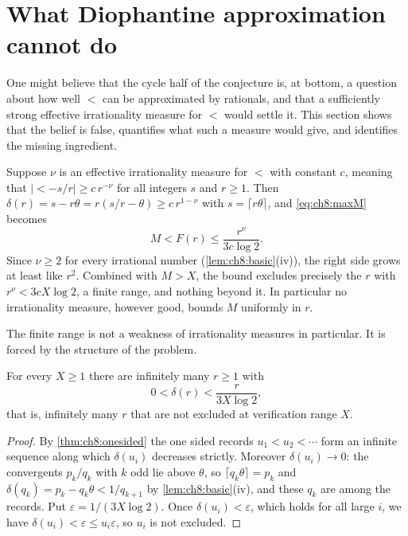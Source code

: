\section{What Diophantine approximation cannot do}\label{sec:ch8:limits}

One might believe that the cycle half of the conjecture is, at bottom,
a question about how well $\lt$ can be approximated by rationals, and that a
sufficiently strong effective irrationality measure for $\lt$ would settle it.
This section shows that the belief is false, quantifies what such a measure
would give, and identifies the missing ingredient.

\begin{remark}\label{rem:irrmeasure}
Suppose $\nu$ is an effective irrationality measure for $\lt$ with constant
$c$, meaning that $|\lt-s/r|\geq c\,r^{-\nu}$ for all integers $s$ and
$r\geq1$. Then $\delta(r)=s-r\theta=r(s/r-\theta)\geq c\,r^{1-\nu}$ with
$s=\lceil r\theta\rceil$, and \eqref{eq:ch8:maxM} becomes
\begin{equation}\label{eq:ch8:irrbound}
  M<F(r)\leq\frac{r^{\nu}}{3c\log2}.
\end{equation}
Since $\nu\geq2$ for every irrational number (\cref{lem:ch8:basic}(iv)), the
right side grows at least like $r^2$. Combined with $M>X$, the bound excludes
precisely the $r$ with $r^{\nu}<3cX\log2$, a finite range, and nothing beyond
it. In particular no irrationality measure, however good, bounds $M$ uniformly in $r$.
\end{remark}

The finite range is not a weakness of irrationality measures in particular.
It is forced by the structure of the problem.

\begin{proposition}\label{prop:ch8:insufficient}
For every $X\geq1$ there are infinitely many $r\geq1$ with
\[
  0<\delta(r)<\frac{r}{3X\log2},
\]
that is, infinitely many $r$ that are not excluded at verification range $X$.
\end{proposition}

\begin{proof}
By \cref{thm:ch8:onesided} the one sided records $u_1<u_2<\cdots$ form an
infinite sequence along which $\delta(u_i)$ decreases strictly. Moreover
$\delta(u_i)\to0$: the convergents $p_k/q_k$ with $k$ odd lie above $\theta$,
so $\lceil q_k\theta\rceil=p_k$ and $\delta(q_k)=p_k-q_k\theta<1/q_{k+1}$ by
\cref{lem:ch8:basic}(iv), and these $q_k$ are among the records. Put
$\varepsilon=1/(3X\log2)$. Once $\delta(u_i)<\varepsilon$, which holds for all
large $i$, we have $\delta(u_i)<\varepsilon\le u_i\varepsilon$, so $u_i$ is
not excluded.
\end{proof}

